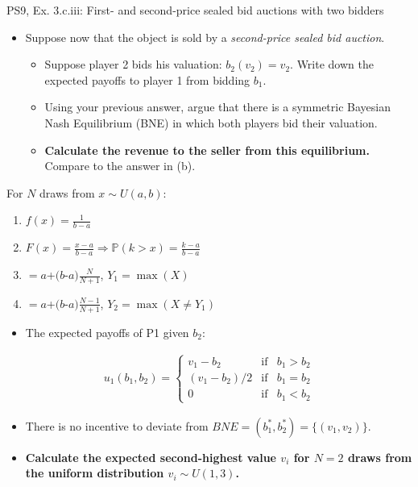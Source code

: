 \begin{frame}{PS9, Ex. 3.c.iii: First- and second-price sealed bid auctions with two bidders}
    \begin{multicols}{2}
      \begin{itemize}
        \item[(c)] Suppose now that the object is sold by a \textit{second-price sealed bid auction}.
        \begin{itemize}\normalsize
          \item[i.]   Suppose player 2 bids his valuation: $b_2(v_2) = v_2$. Write down the expected payoffs to player 1 from bidding $b_1$.
          \item[ii.]  Using your previous answer, argue that there is a symmetric Bayesian Nash Equilibrium (BNE) in which both players bid their valuation.
          \item[iii.] \textbf{Calculate the revenue to the seller from this equilibrium.} Compare to the answer in (b).
        \end{itemize}
      \end{itemize}
      For $N$ draws from $x\sim U(a, b):$
      \vspace{-6pt}
      \begin{enumerate}
        \item[PDF:] $f(x)=\frac{1}{b-a}$
        \item[CDF:] $F(x)=\frac{x-a}{b-a}\Rightarrow\mathbb{P}(k>x)=\frac{k-a}{b-a}$
        \item[$\mathbb{E}(Y_1)$] $=a$+$(b$-$a)\frac{N}{N+1}$, $Y_1=\max(X)$
        \item[$\mathbb{E}(Y_2)$] $=a$+$(b$-$a)\frac{N-1}{N+1}$, $Y_2=\max(X\neq Y_1)$
      \end{enumerate}
      \vfill\null\columnbreak
      \begin{itemize}
        \item[(i)] The expected payoffs of P1 given $b_2$:
      \end{itemize}
      \vspace{-16pt}
      \begin{align*}
        u_1(b_1,b_2)=\left\{\begin{array}{lcl}
          v_1-b_2     & \text{if} & b_1>b_2 \\
          (v_1-b_2)/2 & \text{if} & b_1=b_2 \\
          0           & \text{if} & b_1<b_2
        \end{array}\right.
      \end{align*}
      \vspace{-18pt}
      \begin{itemize}
        \item[(ii)] There is no incentive to deviate from $BNE=(b_1^*,b_2^*)=\{(v_1,v_2)\}$.
        \item[(iii)] \textbf{Calculate the expected second-highest value $v_i$ for $N=2$ draws from the uniform distribution $v_i\sim U(1,3)$.}
      \end{itemize}
      \vfill\null
    \end{multicols}
\end{frame}
